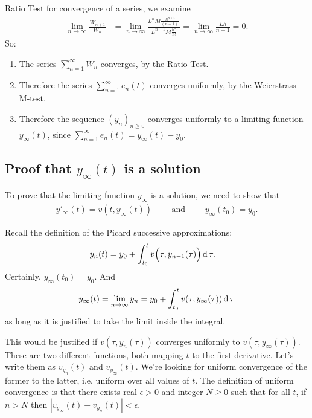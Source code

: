 Ratio Test for convergence of a series, we examine
\begin{align*}
  \lim_{n\to \infty} \frac{W_{n+1}}{W_n}
  &= \lim_{n\to\infty} \frac{L^nM\frac{h^{n+1}}{(n+1)!}}
                          {L^{n-1}M\frac{h^n}{n!}}
   = \lim_{n\to\infty} \frac{Lh}{n+1}
    = 0.
\end{align*}
So:
\begin{enumerate}
\item The series $\sum_{n=1}^\infty W_n$ converges, by the Ratio Test.
\item Therefore the series $\sum_{n=1}^\infty e_n(t)$ converges uniformly, by
  the Weierstrass M-test.
\item Therefore the sequence $(y_n)_{n\geq 0}$ converges uniformly to a
  limiting function $y_\infty(t)$, since
  $\sum_{n=1}^\infty e_n(t) = y_\infty(t) - y_0$.
\end{enumerate}

\subsection{Proof that $y_\infty(t)$ is a solution}

To prove that the limiting function $y_\infty$ is a solution, we need to show
that
\begin{align*}
  y'_\infty(t) = v(t, y_\infty(t)) \text{~~~~~~~and~~~~~~~} y_\infty(t_0) = y_0.
\end{align*}

Recall the definition of the Picard successive approximations:
\begin{align*}
    y_n(t) &= y_0 + \int_{t_0}^t v\Big(\tau, y_{n-1}(\tau)\Big) \operatorname{\text{d}}\tau.
\end{align*}
Certainly, $y_\infty(t_0) = y_0$. And
\begin{align*}
  y_\infty(t) = \lim_{n\to \infty} y_n = y_0 + \int_{t_0}^t v(\tau, y_\infty(\tau)) \operatorname{\text{d}}\tau
\end{align*}
as long as it is justified to take the limit inside the integral.

This would be justified if $v(\tau, y_n(\tau))$ converges uniformly to
$v(\tau, y_\infty(\tau))$. These are two different functions, both mapping $t$
to the first derivative. Let's write them as $v_{y_n}(t)$ and
$v_{y_\infty}(t)$. We're looking for uniform convergence of the former to the
latter, i.e. uniform over all values of $t$. The definition of uniform
convergence is that there exists real $\epsilon > 0$ and integer $N \geq 0$
such that for all $t$, if $n > N$ then
$|v_{y_\infty}(t) - v_{y_n}(t)| < \epsilon$.

